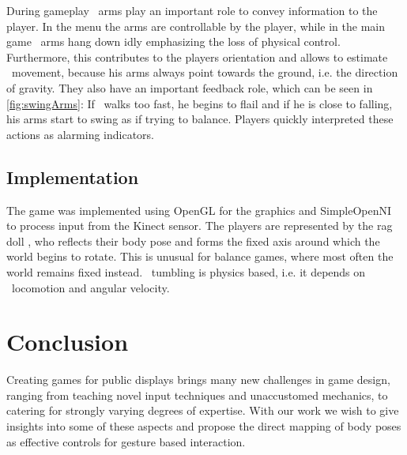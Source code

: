 \documentclass{chi-ext}
\begin{document}
During gameplay \eds\ arms play an important role to convey information to the player. In the menu the arms are controllable by the player, while in the main game \eds\ arms hang down idly emphasizing the loss of physical control. Furthermore, this contributes to the players orientation and allows to estimate \eds\ movement, because his arms always point towards the ground, i.e. the direction of gravity. They also have an important feedback role, which can be seen in \autoref{fig:swingArms}: If \ed\ walks too fast, he begins to flail and if he is close to falling, his arms start to swing as if trying to balance. Players quickly interpreted these actions as alarming indicators.
\subsection{Implementation}
The game was implemented using OpenGL for the graphics and SimpleOpenNI to process input from the Kinect sensor. The players are represented by the rag doll \ed, who reflects their body pose and forms the fixed axis around which the world begins to rotate. This is unusual for balance games, where most often the world remains fixed instead. \eds\ tumbling is physics based, i.e. it depends on \eds\ locomotion and angular velocity.
%
\section{Conclusion}
%
Creating games for public displays brings many new challenges in game design, ranging from teaching novel input techniques and unaccustomed mechanics, to catering for strongly varying degrees of expertise. With our work we wish to give insights into some of these aspects and propose the direct mapping of body poses as effective controls for gesture based interaction. 
\end{document}
